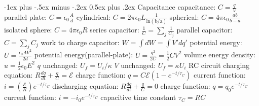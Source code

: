 \documentclass[10pt,landscape]{article}
\makeatletter
\renewcommand{\subsection}{\@startsection{subsection}{2}{0mm}%
                                {-1ex plus -.5ex minus -.2ex}%
                                {0.5ex plus .2ex}%
                                {\normalfont\normalsize\bfseries}}
\newcommand{\spc}{\hspace*{1em}}
\makeatother
\begin{document}
\begin{multicols*}{3}
\subsection{Capacitance}
capacitance: $C=\frac{q}{V}$
\newline
\spc parallel-plate: $C=\epsilon _0\frac{A}{d}$
\newline
\spc cylindrical: $C=2\pi \epsilon _0L\frac{1}{\mathrm{ln(b/a)}}$
\newline
\spc spherical: $C=4\pi \epsilon _0\frac{ab}{b-a}$
\newline
\spc isolated sphere: $C=4\pi \epsilon _0R$
\newline
series capacitor: $\frac{1}{C}=\sum_{j}\frac{1}{C_j}$
\newline
parallel capacitor: $C=\sum _j C_j$
\newline
work to charge capacitor: $W=\int dW=\int V'dq'$
\newline
\spc potential energy: $U=\frac{\epsilon_0AV^2}{2d}$
\newline
potential energy(parallel-plate): $U=\frac{q^2}{2C}=\frac{1}{2}CV^2$
\newline
volume energy density: $u=\frac{1}{2}\epsilon _0E^2$
\newline
\spc $q$ unchanged: $U_f=U_i/\kappa $
\newline
\spc $V$ unchanged: $U_f=\kappa U_i$
\newline \newline
RC circuit
\newline
\spc charging equation: $R\frac{dq}{dt}+\frac{q}{C}=\mathscr{E} $
\newline
\spc \spc charge function: $q=C\mathscr{E} (1-e^{-t/\tau _C })$
\newline
\spc \spc current function: $i=(\frac{\mathscr{E} }{R})e^{-t/\tau _C }$
\newline
\spc discharging equation: $R\frac{dq}{dt}+\frac{q}{C}=0 $
\newline
\spc \spc charge function: $q=q_0e^{-t/\tau _C }$
\newline
\spc \spc current function: $i=-i_0e^{-t/\tau _C }$
\newline
\spc capacitive time constant $\tau _C=RC$


\end{multicols*}
\end{document}
